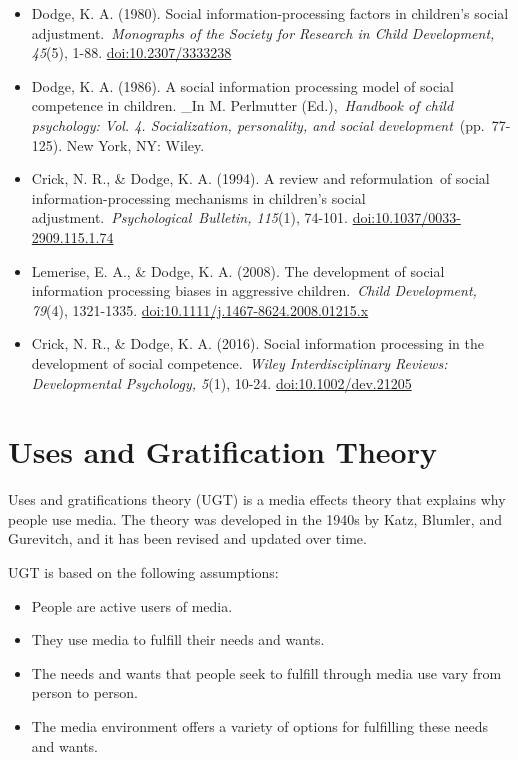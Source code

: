 \documentclass[
]{book}
\begin{document}
\begin{itemize}
\item
  Dodge, K. A. (1980). Social information-processing factors in children's social adjustment.~\emph{Monographs of the Society for Research in Child Development, 45}(5), 1-88. \url{doi:10.2307/3333238}
\item
  Dodge, K. A. (1986). A social information processing model of social competence in children. \_In M. Perlmutter (Ed.),~\emph{Handbook of child psychology: Vol. 4. Socialization, personality, and social development}~(pp.~77-125). New York, NY: Wiley.
\item
  Crick, N. R., \& Dodge, K. A. (1994). A review and reformulation~of social information-processing mechanisms in children's social adjustment.~\emph{Psychological~Bulletin, 115}(1), 74-101. \url{doi:10.1037/0033-2909.115.1.74}
\item
  Lemerise, E. A., \& Dodge, K. A. (2008). The development of social information processing biases in aggressive children.~\emph{Child Development, 79}(4), 1321-1335. \url{doi:10.1111/j.1467-8624.2008.01215.x}
\item
  Crick, N. R., \& Dodge, K. A. (2016). Social information processing in the development of social competence.~\emph{Wiley Interdisciplinary Reviews: Developmental Psychology, 5}(1), 10-24. \url{doi:10.1002/dev.21205}
\end{itemize}

\section{Uses and Gratification Theory}\label{uses-and-gratification-theory}

Uses and gratifications theory (UGT) is a media effects theory that explains why people use media. The theory was developed in the 1940s by Katz, Blumler, and Gurevitch, and it has been revised and updated over time.

UGT is based on the following assumptions:

\begin{itemize}
\item
  People are active users of media.
\item
  They use media to fulfill their needs and wants.
\item
  The needs and wants that people seek to fulfill through media use vary from person to person.
\item
  The media environment offers a variety of options for fulfilling these needs and wants.
\end{itemize}
\end{document}
